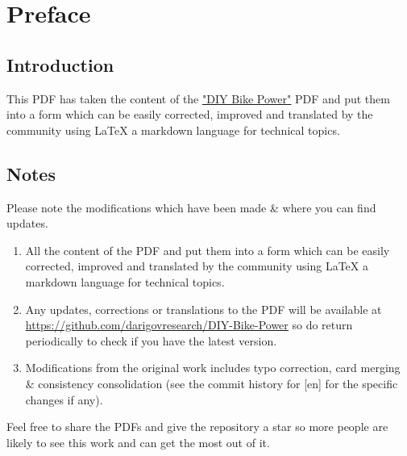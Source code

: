 \documentclass{article}
\theoremstyle{definition}
\theoremstyle{definition}
\theoremstyle{remark}
\begin{document}
\newpage

\tableofcontents

\newpage

\section{Preface} %
\label{sec:preface}

  \subsection*{Introduction} %
  \label{sub:introduction}
  
    This PDF has taken the content of the \href{https://www.demandenergyequality.org/build-your-own-bike-generators}{\underline{"DIY Bike Power"}} PDF and put them into a form which can be easily corrected, improved and translated by the community using LaTeX a markdown language for technical topics.


  \subsection*{Notes} %
  \label{sub:notes}

    Please note the modifications which have been made \& where you can find updates.

    \begin{enumerate}
      \item All the content of the PDF and put them into a form which can be easily corrected, improved and translated by the community using LaTeX a markdown language for technical topics.
      \item Any updates, corrections or translations to the PDF will be available at \href{https://github.com/darigovresearch/DIY-Bike-Power}{\underline{https://github.com/darigovresearch/DIY-Bike-Power}} so do return periodically to check if you have the latest version.
      \item Modifications from the original work includes typo correction, card merging \& consistency consolidation (see the commit history for [en] for the specific changes if any).
    \end{enumerate}

    Feel free to share the PDFs and give the repository a star so more people are likely to see this work and can get the most out of it.

\end{document}
